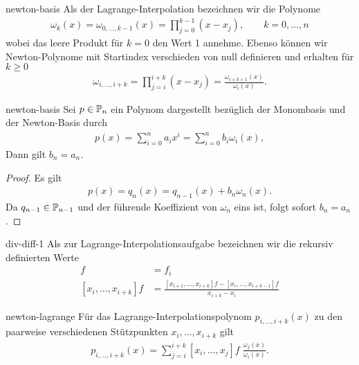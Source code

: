 \begin{Definition}{newton-basis}
  Als  der Lagrange-Interpolation bezeichnen wir
  die Polynome
  \begin{gather}
    \omega_k(x)
    = \omega_{0,\dots,k-1}(x)
    = \prod_{j=0}^{k-1} (x-x_j),
    \qquad k=0,\dots,n
  \end{gather}
  wobei das leere Produkt für $k=0$ den Wert 1 annehme. Ebenso können
  wir Newton-Polynome mit Startindex verschieden von null definieren
  und erhalten für $k\ge 0$
  \begin{gather}
    \omega_{i,\dots,i+k} = \prod_{j=i}^{i+k} (x-x_j)
    = \frac{\omega_{i+k+1}(x)}{\omega_{i}(x)}.
  \end{gather}
\end{Definition}

\begin{Lemma}{newton-basis}
  Sei $p \in \P_n$ ein Polynom dargestellt bezüglich der Monombasis
  und der Newton-Basis durch
  \begin{gather}
    p(x) = \sum_{i=0}^n a_i x^i = \sum_{i=0}^n b_i \omega_i(x),
  \end{gather}
  Dann gilt $b_n = a_n$.
\end{Lemma}

\begin{proof}
  Es gilt
  \begin{gather}
    p(x) = q_n(x) = q_{n-1}(x) + b_n \omega_n(x).
  \end{gather}
  Da $q_{n-1}\in \P_{n-1}$ und der führende Koeffizient von $\omega_n$ eins ist, folgt sofort $b_n = a_n$.
\end{proof}

\begin{Definition}{div-diff-1}
  Als  zur
  Lagrange-Interpolationsaufgabe bezeichnen wir die rekursiv
  definierten Werte
  \begin{align}
    [x_i]f
    &= f_i \\
    [x_i,\dots,x_{i+k}]f
    &= \frac{[x_{i+1},\dots,x_{i+k}]f - [x_i,\dots,x_{i+k-1}]f}{x_{i+k}-x_i}
  \end{align}
\end{Definition}

\begin{Satz}{newton-lagrange}
  Für das Lagrange-Interpolationspolynom $p_{i,\dots,i+k}(x)$ zu den
  paarweise verschiedenen Stützpunkten $x_i,\dots,x_{i+k}$ gilt
  \begin{gather}
    p_{i,\dots,i+k}(x)
    = \sum_{j=i}^{i+k} [x_i,\dots,x_{j}]f\; \frac{\omega_j(x)}{\omega_i(x)}.
  \end{gather}
\end{Satz}

